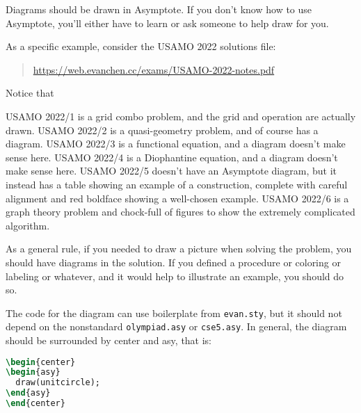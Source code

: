 \documentclass[11pt]{scrartcl}
\begin{document}
\alert{Diagrams should be drawn in Asymptote}.
If you don't know how to use Asymptote,
you'll either have to learn or ask someone to help draw for you.

As a specific example, consider the USAMO 2022 solutions file:
\begin{quote}
  \url{https://web.evanchen.cc/exams/USAMO-2022-notes.pdf}
\end{quote}
Notice that
\begin{itemize}
  \ii USAMO 2022/1 is a grid combo problem, and the grid and operation are
  actually drawn.
  \ii USAMO 2022/2 is a quasi-geometry problem, and of course has a diagram.
  \ii USAMO 2022/3 is a functional equation, and a diagram doesn't make sense here.
  \ii USAMO 2022/4 is a Diophantine equation, and a diagram doesn't make sense here.
  \ii USAMO 2022/5 doesn't have an Asymptote diagram,
  but it instead has a table showing an example of a construction,
  complete with careful alignment and red boldface showing a well-chosen example.
  \ii USAMO 2022/6 is a graph theory problem and chock-full of figures
  to show the extremely complicated algorithm.
\end{itemize}

As a general rule, if you needed to draw a picture when solving the problem,
you should have diagrams in the solution.
If you defined a procedure or coloring or labeling or whatever,
and it would help to illustrate an example, you should do so.

The code for the diagram can use boilerplate from \texttt{evan.sty},
but it should not depend on the nonstandard \texttt{olympiad.asy} or \texttt{cse5.asy}.
In general, the diagram should be surrounded by center and asy, that is:
\begin{lstlisting}[language=TeX]
\begin{center}
\begin{asy}
  draw(unitcircle);
\end{asy}
\end{center}
\end{lstlisting}
\end{document}
